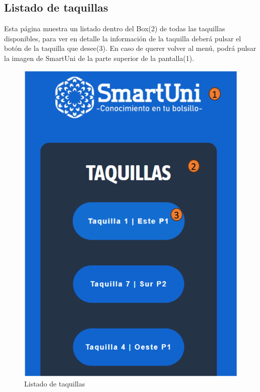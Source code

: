 \documentclass[12pt]{report}
\begin{document}
\begin{appendices}
\section{Listado de taquillas}
Esta página muestra un listado dentro del Box(2) de todas las taquillas disponibles, para ver en detalle la información de la taquilla deberá pulsar el botón de la taquilla que desee(3). En caso de querer volver al menú, podrá pulsar la imagen de SmartUni de la parte superior de la pantalla(1).\\
\begin{figure}[H]
    \centering
    \includegraphics[scale = 0.7]{imagenes//manual_de_usuario/6.png}
    \caption{Listado de taquillas}
    \label{fig:enter-label}
\end{figure}
\newpage

\end{appendices}
\end{document}
